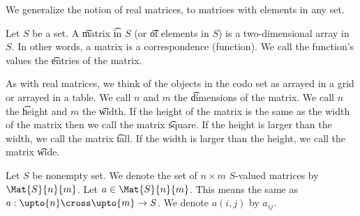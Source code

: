 
 We generalize the notion of real matrices, to matrices with elements in any set.


Let $S$ be a set.
A \t{matrix} \t{in} $S$ (or \t{of} elements in $S$) is a two-dimensional array in $S$.
In other words, a matrix is a correspondence (function).
We call the function's values the \t{entries} of the matrix.

As with real matrices, we think of the objects in the codo set as arrayed in a grid or arrayed in a table.
We call $n$ and $m$ the \t{dimensions} of the matrix.
We call $n$ the \t{height} and $m$ the \t{width}.
If the height of the matrix is the same as the width of the matrix then we call the matrix \t{square}.
If the height is larger than the width, we call the matrix \t{tall}.
If the width is larger than the height, we call the matrix \t{wide}.


Let $S$ be nonempty set.
We denote the set of $n \times m$ $S$-valued matrices by $\Mat{S}{n}{m}$.
Let $a \in \Mat{S}{n}{m}$.
This means the same as $a: \upto{n} \cross \upto{m} \to S$.
We denote $a(i, j)$ by $a_{ij}$.

\blankpage
